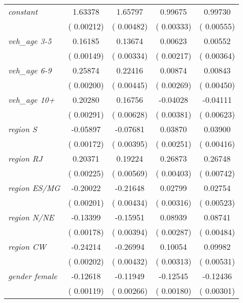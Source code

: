 {\begin{ThreePartTable}
\begin{longtable}{lcccc}
    \textit{constant} &  1.63378 &  1.65797 &  0.99675 &  0.99730 \\
    & \scriptsize{( 0.00212)} & \scriptsize{( 0.00482)} & \scriptsize{( 0.00333)} & \scriptsize{( 0.00555)} \\
    \textit{veh\_age 3-5} &  0.16185 &  0.13674 &  0.00623 &  0.00552 \tnote{\dag\dag} \\
    & \scriptsize{( 0.00149)} & \scriptsize{( 0.00334)} & \scriptsize{( 0.00217)} & \scriptsize{( 0.00364)} \\
    \textit{veh\_age 6-9} &  0.25874 &  0.22416 &  0.00874 &  0.00843 \tnote{\dag} \\
    & \scriptsize{( 0.00200)} & \scriptsize{( 0.00445)} & \scriptsize{( 0.00269)} & \scriptsize{( 0.00450)} \\
    \textit{veh\_age 10+} &  0.20280 &  0.16756 & -0.04028 & -0.04111 \\
    & \scriptsize{( 0.00291)} & \scriptsize{( 0.00628)} & \scriptsize{( 0.00381)} & \scriptsize{( 0.00623)} \\
    \textit{region S} & -0.05897 & -0.07681 &  0.03870 &  0.03900 \\
    & \scriptsize{( 0.00172)} & \scriptsize{( 0.00395)} & \scriptsize{( 0.00251)} & \scriptsize{( 0.00416)} \\
    \textit{region RJ} &  0.20371 &  0.19224 &  0.26873 &  0.26748 \\
    & \scriptsize{( 0.00225)} & \scriptsize{( 0.00569)} & \scriptsize{( 0.00403)} & \scriptsize{( 0.00742)} \\
    \textit{region ES/MG} & -0.20022 & -0.21648 &  0.02799 &  0.02754 \\
    & \scriptsize{( 0.00201)} & \scriptsize{( 0.00434)} & \scriptsize{( 0.00316)} & \scriptsize{( 0.00523)} \\
    \textit{region N/NE} & -0.13399 & -0.15951 &  0.08939 &  0.08741 \\
    & \scriptsize{( 0.00178)} & \scriptsize{( 0.00394)} & \scriptsize{( 0.00287)} & \scriptsize{( 0.00484)} \\
    \textit{region CW} & -0.24214 & -0.26994 &  0.10054 &  0.09982 \\
    & \scriptsize{( 0.00202)} & \scriptsize{( 0.00432)} & \scriptsize{( 0.00313)} & \scriptsize{( 0.00531)} \\
    \textit{gender female} & -0.12618 & -0.11949 & -0.12545 & -0.12436 \\
    & \scriptsize{( 0.00119)} & \scriptsize{( 0.00266)} & \scriptsize{( 0.00180)} & \scriptsize{( 0.00301)} \\

\end{longtable}
\end{ThreePartTable}}
